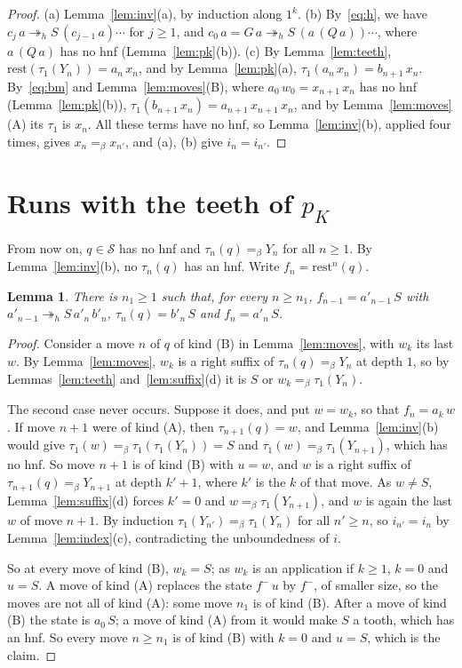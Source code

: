 \documentclass[11pt]{amsart}
\newtheorem{lemma}[theorem]{Lemma}
\theoremstyle{definition}
\newcommand{\Ter}{\mathcal S}
\newcommand{\hred}{\twoheadrightarrow_h}
\newcommand{\conv}{=_\beta}
\newcommand{\rest}{\mathrm{rest}}
\begin{document}
\begin{proof}
(a) Lemma~\ref{lem:inv}(a), by induction along $1^k$. (b) By~\eqref{eq:h}, we have
$c_j\,a\hred S\,(c_{j-1}\,a)\cdots$ for $j\ge1$, and $c_0\,a=G\,a\hred S\,(a\,(Q\,a))\cdots$, where
$a\,(Q\,a)$ has no hnf (Lemma~\ref{lem:pk}(b)). (c) By Lemma~\ref{lem:teeth},
$\rest(\tau_1(Y_n))=a_n\,x_n$, and by Lemma~\ref{lem:pk}(a), $\tau_1(a_n\,x_n)=b_{n+1}\,x_n$.
By~\eqref{eq:bm} and Lemma~\ref{lem:moves}(B), where $a_0\,w_0=x_{n+1}\,x_n$ has no hnf
(Lemma~\ref{lem:pk}(b)),
$\tau_1(b_{n+1}\,x_n)=a_{n+1}\,x_{n+1}\,x_n$, and by Lemma~\ref{lem:moves}(A) its $\tau_1$ is $x_n$.
All these terms have no hnf, so Lemma~\ref{lem:inv}(b), applied four times, gives
$x_n\conv x_{n'}$, and (a), (b) give $i_n=i_{n'}$.
\end{proof}

\section{Runs with the teeth of \texorpdfstring{$p_K$}{pK}}\label{sec:q}

From now on, $q\in\Ter$ has no hnf and $\tau_n(q)\conv Y_n$ for all $n\ge1$. By
Lemma~\ref{lem:inv}(b), no $\tau_n(q)$ has an hnf. Write $f_n=\rest^n(q)$.

\begin{lemma}\label{lem:srun}
There is $n_1\ge1$ such that, for every $n\ge n_1$, $f_{n-1}=a'_{n-1}\,S$ with
$a'_{n-1}\hred S\,a'_n\,b'_n$, $\tau_n(q)=b'_n\,S$ and $f_n=a'_n\,S$.
\end{lemma}

\begin{proof}
Consider a move $n$ of $q$ of kind (B) in Lemma~\ref{lem:moves}, with $w_k$ its last $w$. By
Lemma~\ref{lem:moves}, $w_k$ is a right suffix of $\tau_n(q)\conv Y_n$ at depth $1$, so by
Lemmas~\ref{lem:teeth} and~\ref{lem:suffix}(d) it is $S$ or $w_k\conv\tau_1(Y_n)$.

The second case never occurs. Suppose it does, and put $w=w_k$, so that $f_n=a_k\,w$. If move $n+1$ were of
kind (A), then $\tau_{n+1}(q)=w$, and Lemma~\ref{lem:inv}(b) would give
$\tau_1(w)\conv\tau_1(\tau_1(Y_n))=S$ and $\tau_1(w)\conv\tau_1(Y_{n+1})$, which has no hnf.
So move $n+1$ is of kind (B) with $u=w$, and $w$ is a right suffix of $\tau_{n+1}(q)\conv Y_{n+1}$ at
depth $k'+1$, where $k'$ is the $k$ of that move. As $w\ne S$, Lemma~\ref{lem:suffix}(d) forces
$k'=0$ and $w\conv\tau_1(Y_{n+1})$, and $w$ is again the last $w$ of move $n+1$. By induction
$\tau_1(Y_{n'})\conv\tau_1(Y_n)$ for all $n'\ge n$, so $i_{n'}=i_n$ by Lemma~\ref{lem:index}(c),
contradicting the unboundedness of $i$.

So at every move of kind (B), $w_k=S$; as $w_k$ is an application if $k\ge1$, $k=0$ and $u=S$. A
move of kind (A) replaces the state $f^-\,u$ by $f^-$, of smaller size, so the moves are not all of
kind (A): some move $n_1$ is of kind (B). After a
move of kind (B) the state is $a_0\,S$; a move of kind (A) from it would make $S$ a tooth, which has an
hnf. So every move $n\ge n_1$ is of kind (B) with $k=0$ and $u=S$, which is the claim.
\end{proof}
\end{document}
